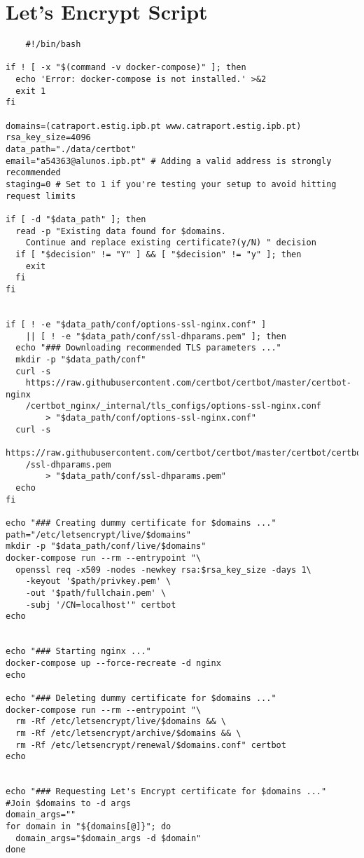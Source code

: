 \section{Let's Encrypt Script}\label{letsencryptscript}

\begin{Verbatim}
    #!/bin/bash

if ! [ -x "$(command -v docker-compose)" ]; then
  echo 'Error: docker-compose is not installed.' >&2
  exit 1
fi

domains=(catraport.estig.ipb.pt www.catraport.estig.ipb.pt)
rsa_key_size=4096
data_path="./data/certbot"
email="a54363@alunos.ipb.pt" # Adding a valid address is strongly recommended
staging=0 # Set to 1 if you're testing your setup to avoid hitting request limits

if [ -d "$data_path" ]; then
  read -p "Existing data found for $domains. 
    Continue and replace existing certificate?(y/N) " decision
  if [ "$decision" != "Y" ] && [ "$decision" != "y" ]; then
    exit
  fi
fi


if [ ! -e "$data_path/conf/options-ssl-nginx.conf" ] 
    || [ ! -e "$data_path/conf/ssl-dhparams.pem" ]; then
  echo "### Downloading recommended TLS parameters ..."
  mkdir -p "$data_path/conf"
  curl -s 
    https://raw.githubusercontent.com/certbot/certbot/master/certbot-nginx
    /certbot_nginx/_internal/tls_configs/options-ssl-nginx.conf 
        > "$data_path/conf/options-ssl-nginx.conf"
  curl -s 
    https://raw.githubusercontent.com/certbot/certbot/master/certbot/certbot
    /ssl-dhparams.pem 
        > "$data_path/conf/ssl-dhparams.pem"
  echo
fi

echo "### Creating dummy certificate for $domains ..."
path="/etc/letsencrypt/live/$domains"
mkdir -p "$data_path/conf/live/$domains"
docker-compose run --rm --entrypoint "\
  openssl req -x509 -nodes -newkey rsa:$rsa_key_size -days 1\
    -keyout '$path/privkey.pem' \
    -out '$path/fullchain.pem' \
    -subj '/CN=localhost'" certbot
echo


echo "### Starting nginx ..."
docker-compose up --force-recreate -d nginx
echo

echo "### Deleting dummy certificate for $domains ..."
docker-compose run --rm --entrypoint "\
  rm -Rf /etc/letsencrypt/live/$domains && \
  rm -Rf /etc/letsencrypt/archive/$domains && \
  rm -Rf /etc/letsencrypt/renewal/$domains.conf" certbot
echo


echo "### Requesting Let's Encrypt certificate for $domains ..."
#Join $domains to -d args
domain_args=""
for domain in "${domains[@]}"; do
  domain_args="$domain_args -d $domain"
done


\end{Verbatim}
